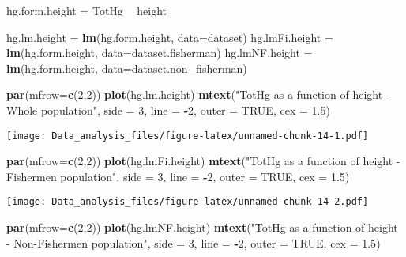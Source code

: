 \documentclass[12pt,]{article}
\newenvironment{Shaded}{\begin{snugshade}}{\end{snugshade}}
\newcommand{\KeywordTok}[1]{\textcolor[rgb]{0.13,0.29,0.53}{\textbf{#1}}}
\newcommand{\DataTypeTok}[1]{\textcolor[rgb]{0.13,0.29,0.53}{#1}}
\newcommand{\DecValTok}[1]{\textcolor[rgb]{0.00,0.00,0.81}{#1}}
\newcommand{\FloatTok}[1]{\textcolor[rgb]{0.00,0.00,0.81}{#1}}
\newcommand{\StringTok}[1]{\textcolor[rgb]{0.31,0.60,0.02}{#1}}
\newcommand{\OtherTok}[1]{\textcolor[rgb]{0.56,0.35,0.01}{#1}}
\newcommand{\OperatorTok}[1]{\textcolor[rgb]{0.81,0.36,0.00}{\textbf{#1}}}
\newcommand{\NormalTok}[1]{#1}
\begin{document}
\begin{Shaded}
\begin{Highlighting}[]
\NormalTok{hg.form.height =}\StringTok{ }\NormalTok{TotHg }\OperatorTok{~}\StringTok{ }\NormalTok{height}

\NormalTok{hg.lm.height =}\StringTok{ }\KeywordTok{lm}\NormalTok{(hg.form.height, }\DataTypeTok{data=}\NormalTok{dataset)}
\NormalTok{hg.lmFi.height =}\StringTok{ }\KeywordTok{lm}\NormalTok{(hg.form.height, }\DataTypeTok{data=}\NormalTok{dataset.fisherman)}
\NormalTok{hg.lmNF.height =}\StringTok{ }\KeywordTok{lm}\NormalTok{(hg.form.height, }\DataTypeTok{data=}\NormalTok{dataset.non_fisherman)}

\KeywordTok{par}\NormalTok{(}\DataTypeTok{mfrow=}\KeywordTok{c}\NormalTok{(}\DecValTok{2}\NormalTok{,}\DecValTok{2}\NormalTok{))}
\KeywordTok{plot}\NormalTok{(hg.lm.height)}
\KeywordTok{mtext}\NormalTok{(}\StringTok{"TotHg as a function of height - Whole population"}\NormalTok{, }\DataTypeTok{side =} \DecValTok{3}\NormalTok{, }\DataTypeTok{line =} \OperatorTok{-}\DecValTok{2}\NormalTok{, }\DataTypeTok{outer =} \OtherTok{TRUE}\NormalTok{, }\DataTypeTok{cex =} \FloatTok{1.5}\NormalTok{)}
\end{Highlighting}
\end{Shaded}

\texttt{[image: Data\_analysis\_files/figure-latex/unnamed-chunk-14-1.pdf]}

\begin{Shaded}
\begin{Highlighting}[]
\KeywordTok{par}\NormalTok{(}\DataTypeTok{mfrow=}\KeywordTok{c}\NormalTok{(}\DecValTok{2}\NormalTok{,}\DecValTok{2}\NormalTok{))}
\KeywordTok{plot}\NormalTok{(hg.lmFi.height)}
\KeywordTok{mtext}\NormalTok{(}\StringTok{"TotHg as a function of height - Fishermen population"}\NormalTok{, }\DataTypeTok{side =} \DecValTok{3}\NormalTok{, }\DataTypeTok{line =} \OperatorTok{-}\DecValTok{2}\NormalTok{, }\DataTypeTok{outer =} \OtherTok{TRUE}\NormalTok{, }\DataTypeTok{cex =} \FloatTok{1.5}\NormalTok{)}
\end{Highlighting}
\end{Shaded}

\texttt{[image: Data\_analysis\_files/figure-latex/unnamed-chunk-14-2.pdf]}

\begin{Shaded}
\begin{Highlighting}[]
\KeywordTok{par}\NormalTok{(}\DataTypeTok{mfrow=}\KeywordTok{c}\NormalTok{(}\DecValTok{2}\NormalTok{,}\DecValTok{2}\NormalTok{))}
\KeywordTok{plot}\NormalTok{(hg.lmNF.height)}
\KeywordTok{mtext}\NormalTok{(}\StringTok{"TotHg as a function of height - Non-Fishermen population"}\NormalTok{, }\DataTypeTok{side =} \DecValTok{3}\NormalTok{, }\DataTypeTok{line =} \OperatorTok{-}\DecValTok{2}\NormalTok{, }\DataTypeTok{outer =} \OtherTok{TRUE}\NormalTok{, }\DataTypeTok{cex =} \FloatTok{1.5}\NormalTok{)}
\end{Highlighting}
\end{Shaded}
\end{document}

